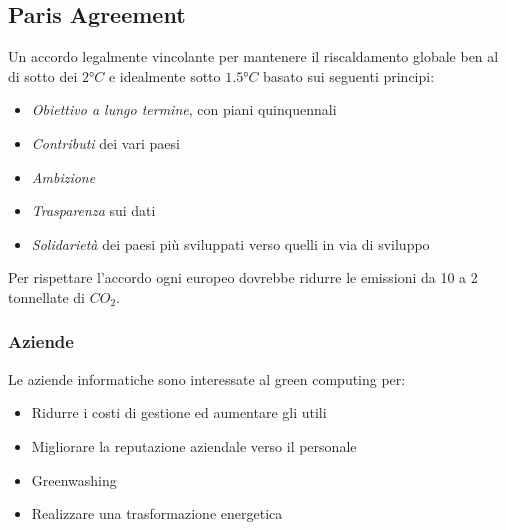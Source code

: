 \subsection{Paris Agreement}
Un accordo legalmente vincolante per mantenere il riscaldamento globale ben al di sotto dei $2°C$ e idealmente sotto $1.5°C$ basato sui seguenti principi:
\begin{itemize}
	\item \textit{Obiettivo a lungo termine}, con piani quinquennali
	\item \textit{Contributi} dei vari paesi
	\item \textit{Ambizione}
	\item \textit{Trasparenza} sui dati
	\item \textit{Solidarietà} dei paesi più sviluppati verso quelli in via di sviluppo
\end{itemize}
Per rispettare l'accordo ogni europeo dovrebbe ridurre le emissioni da 10 a 2 tonnellate di $CO_2$.

\subsubsection{Aziende}
Le aziende informatiche sono interessate al green computing per:
\begin{itemize}
	\item Ridurre i costi di gestione ed aumentare gli utili
	\item Migliorare la reputazione aziendale verso il personale
	\item Greenwashing
	\item Realizzare una trasformazione energetica
\end{itemize}